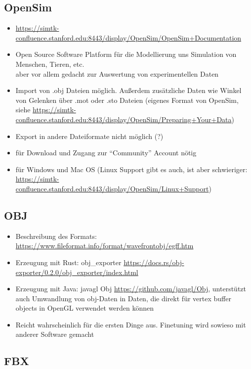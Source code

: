 \subsection{OpenSim}

\begin{itemize}
 \item \url{https://simtk-confluence.stanford.edu:8443/display/OpenSim/OpenSim+Documentation}
 \item Open Source Software Platform für die Modellierung uns Simulation von Menschen, Tieren, etc.\\
 aber vor allem gedacht zur Auswertung von experimentellen Daten
 \item Import von .obj Dateien möglich. Außerdem zusätzliche Daten wie Winkel von Gelenken über .mot oder .sto Dateien (eigenes Format von OpenSim, siehe \url{https://simtk-confluence.stanford.edu:8443/display/OpenSim/Preparing+Your+Data})
 \item Export in andere Dateiformate nicht möglich (?)
 \item für Download und Zugang zur "`Community"' Account nötig
 \item für Windows und Mac OS (Linux Support gibt es auch, ist aber schwieriger: \url{https://simtk-confluence.stanford.edu:8443/display/OpenSim/Linux+Support})
\end{itemize}


\subsection{OBJ}

\begin{itemize}
 \item Beschreibung des Formats: \url{https://www.fileformat.info/format/wavefrontobj/egff.htm}
 \item Erzeugung mit Rust: obj\_exporter \url{https://docs.rs/obj-exporter/0.2.0/obj_exporter/index.html}
 \item Erzeugung mit Java: javagl Obj \url{https://github.com/javagl/Obj}, unterstützt auch Umwandlung von obj-Daten in Daten, die direkt für vertex buffer objects in OpenGL verwendet werden können
 \item Reicht wahrscheinlich für die ersten Dinge aus. Finetuning wird sowieso mit anderer Software gemacht
\end{itemize}

\subsection{FBX}

